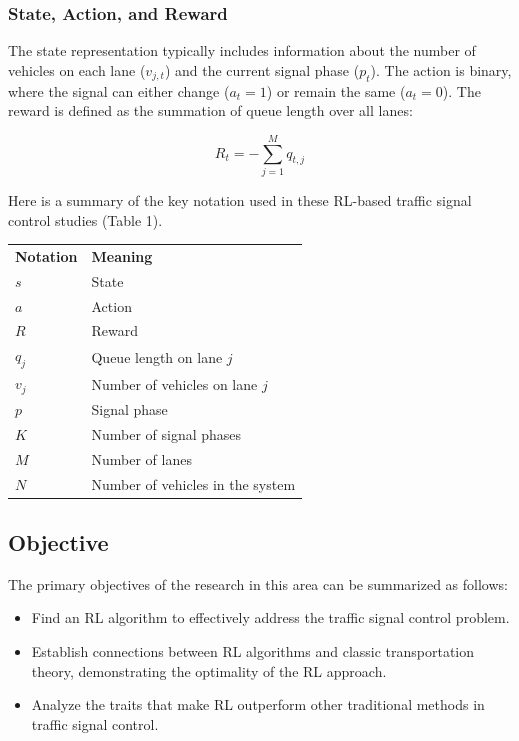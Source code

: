 \subsubsection{State, Action, and Reward}

The state representation typically includes information about the number of vehicles on each lane ($v_{j,t}$) and the current signal phase ($p_t$). The action is binary, where the signal can either change ($a_t = 1$) or remain the same ($a_t = 0$). The reward is defined as the summation of queue length over all lanes:

\[
R_t = -\sum_{j=1}^M q_{t, j}
\]

Here is a summary of the key notation used in these RL-based traffic signal control studies (Table 1).

\begin{table}[h]
\centering
\begin{tabular}{ll}
\textbf{Notation} & \textbf{Meaning} \\
$s$ & State \\
$a$ & Action \\
$R$ & Reward \\
$q_j$ & Queue length on lane $j$ \\
$v_j$ & Number of vehicles on lane $j$ \\
$p$ & Signal phase \\
$K$ & Number of signal phases \\
$M$ & Number of lanes \\
$N$ & Number of vehicles in the system \\
\end{tabular}
\end{table}

\subsection{Objective}

The primary objectives of the research in this area can be summarized as follows:

\begin{itemize}
    \item Find an RL algorithm to effectively address the traffic signal control problem.
    \item Establish connections between RL algorithms and classic transportation theory, demonstrating the optimality of the RL approach.
    \item Analyze the traits that make RL outperform other traditional methods in traffic signal control.
\end{itemize}


